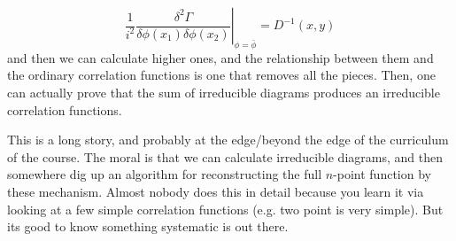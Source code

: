 \begin{equation}
    \left.\frac{1}{i^2}\frac{\delta^2\Gamma}{\delta\phi(x_1)\delta\phi(x_2)}\right|_{\phi = \bar{\phi}} = D^{-1}(x, y)
\end{equation}
and then we can calculate higher ones, and the relationship between them and the ordinary correlation functions is one that removes all the pieces. Then, one can actually prove that the sum of irreducible diagrams produces an irreducible correlation functions.

This is a long story, and probably at the edge/beyond the edge of the curriculum of the course. The moral is that we can calculate irreducible diagrams, and then somewhere dig up an algorithm for reconstructing the full $n$-point function by these mechanism. Almost nobody does this in detail because you learn it via looking at a few simple correlation functions (e.g. two point is very simple). But its good to know something systematic is out there.